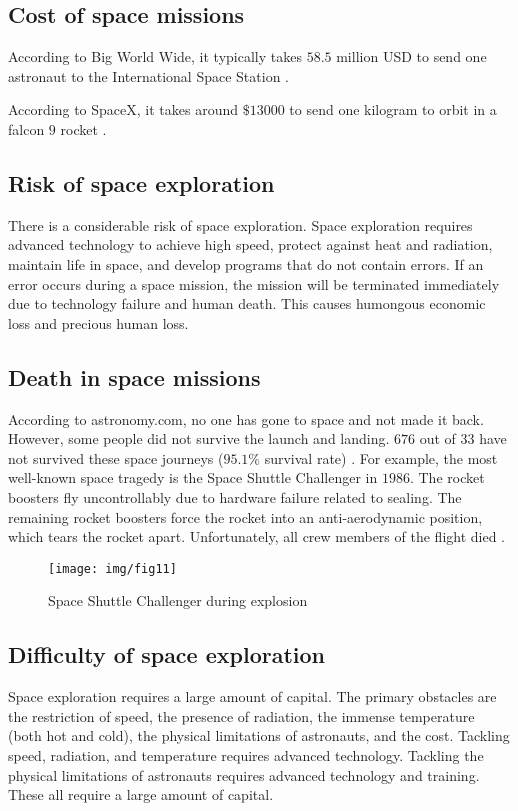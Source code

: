 \documentclass{article}
\begin{document}
\subsection{Cost of space missions}
According to Big World Wide, it typically takes $58.5$ million USD to send one astronaut to the International Space Station \cite{cite11}. 
 
According to SpaceX, it takes around $\$13000$ to send one kilogram to orbit in a falcon $9$ rocket \cite{cite12}. 
\subsection{Risk of space exploration}
There is a considerable risk of space exploration. Space exploration requires advanced technology to achieve high speed, protect against heat and radiation, maintain life in space, and develop programs that do not contain errors. If an error occurs during a space mission, the mission will be terminated immediately due to technology failure and human death. This causes humongous economic loss and precious human loss.  
\subsection{Death in space missions}
According to astronomy.com, no one has gone to space and not made it back. However, some people did not survive the launch and landing. $676$ out of $33$ have not survived these space journeys ($95.1\%$ survival rate) \cite{cite13}. For example, the most well-known space tragedy is the Space Shuttle Challenger in $1986$. The rocket boosters fly uncontrollably due to hardware failure related to sealing. The remaining rocket boosters force the rocket into an anti-aerodynamic position, which tears the rocket apart. Unfortunately, all crew members of the flight died \cite{cite14}. 
\begin{figure}[htbp]
    \center
    \texttt{[image: img/fig11]}
    \caption{Space Shuttle Challenger during explosion}
\end{figure}
\subsection{Difficulty of space exploration}
Space exploration requires a large amount of capital. The primary obstacles are the restriction of speed, the presence of radiation, the immense temperature (both hot and cold), the physical limitations of astronauts, and the cost. Tackling speed, radiation, and temperature requires advanced technology. Tackling the physical limitations of astronauts requires advanced technology and training. These all require a large amount of capital. 
\end{document}

